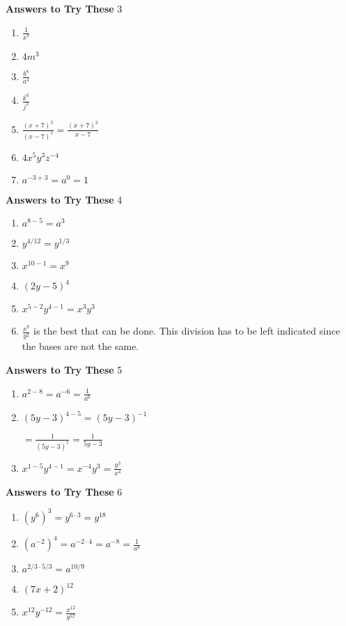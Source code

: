 \documentclass[a4paper]{JAC2003}
\begin{document}
\noindent\textcolor{red!75!black}{\textbf{Answers to Try These}} 3
\begin{enumerate}
\item $\frac{1}{x^{7}}$

\item $4 m^{3}$

\item $\frac{b^{8}}{a^{4}}$

\item $\frac{k^{6}}{j^{2}}$

\item $\frac{(x+7)^{2}}{(x-7)^{1}}=\frac{(x+7)^{2}}{x-7}$

\item $4 x^{5} y^{3} z^{-4}$

\item $a^{-3+3}=a^{0}=1$
\end{enumerate}

\noindent\textcolor{red!75!black}{\textbf{Answers to Try These}} 4
\begin{enumerate}
\item $a^{8-5}=a^{3}$

\item $y^{4 / 12}=y^{1 / 3}$

\item $x^{10-1}=x^{9}$

\item $(2 y-5)^{4}$

\item $x^{5-2} y^{4-1}=x^{3} y^{3}$

\item $\frac{x^{8}}{y^{2}}$ is the best that can be done. This division has to be left indicated since the bases are not the same.
\end{enumerate}

\noindent\textcolor{red!75!black}{\textbf{Answers to Try These}} 5
\begin{enumerate}
\item $a^{2-8}=a^{-6}=\frac{1}{a^{6}}$

\item $(5 y-3)^{4-5}=(5 y-3)^{-1}$%

$=\frac{1}{(5 y-3)^{1}}=\frac{1}{5 y-3}$

\item $x^{1-5} y^{4-1}=x^{-4} y^{3}=\frac{y^{3}}{x^{4}}$
\end{enumerate}

\noindent\textcolor{red!75!black}{\textbf{Answers to Try These}} 6
\begin{enumerate}
\item $\left(y^{6}\right)^{3}=y^{6 \cdot 3}=y^{18}$

\item $\left(a^{-2}\right)^{4}=a^{-2 \cdot 4}=a^{-8}=\frac{1}{a^{8}}$

\item $a^{2 / 3 \cdot 5 / 3}=a^{10 / 9}$

\item $(7 x+2)^{12}$

\item $x^{12} y^{-12}=\frac{x^{12}}{y^{12}}$
\end{enumerate}
\end{document}
